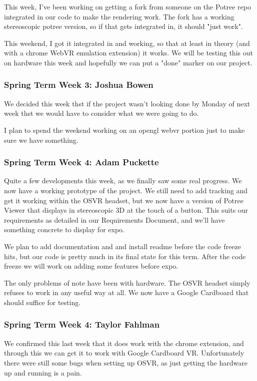 \documentclass[draftclsnofoot,onecolumn]{IEEEtran}
\begin{document}
This week, I've been working on getting a fork from someone on the Potree repo integrated in our code to make the rendering work. The fork has a working stereoscopic potree version, so if that gets integrated in, it should "just work".

This weekend, I got it integrated in and working, so that at least in theory (and with a chrome WebVR emulation extension) it works. We will be testing this out on hardware this week and hopefully we can put a "done" marker on our project.

\subsubsection{Spring Term Week 3: Joshua Bowen}

We decided this week thst if the project wasn't looking done by Monday of next week thst we would have to consider what we were going to do.

I plan to spend the weekend working on an opengl webvr portion just to make sure we have something.

\subsubsection{Spring Term Week 4: Adam Puckette}

Quite a few developments this week, as we finally saw some real progress. We now have a working prototype of the project. We still need to add tracking and get it working within the OSVR headset, but we now have a version of Potree Viewer that displays in stereoscopic 3D at the touch of a button. This suits our requirements as detailed in our Requirements Document, and we'll have something concrete to display for expo.

We plan to add documentation and and install readme before the code freeze hits, but our code is pretty much in its final state for this term. After the code freeze we will work on adding some features before expo.

The only problems of note have been with hardware. The OSVR headset simply refuses to work in any useful way at all. We now have a Google Cardboard that should suffice for testing.

\subsubsection{Spring Term Week 4: Taylor Fahlman}

We confirmed this last week that it does work with the chrome extension, and through this we can get it to work with Google Cardboard VR. Unfortunately there were still some bugs when setting up OSVR, as just getting the hardware up and running is a pain.
\end{document}
